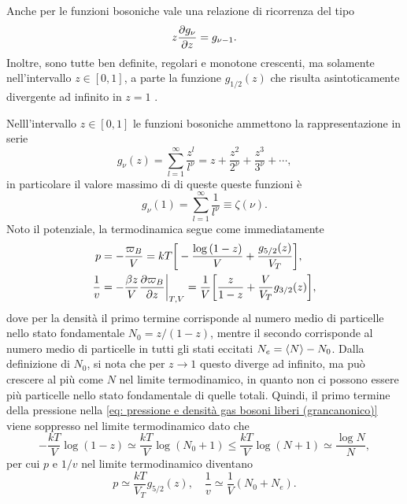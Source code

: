 \begin{obs}
    Anche per le funzioni bosoniche vale una relazione di ricorrenza del tipo
    \begin{equation}
        z\frac{\partial g_\nu}{\partial z} = g_{\nu - 1}.
    \end{equation}
    Inoltre, sono tutte ben definite, regolari e monotone crescenti, ma solamente nell'intervallo $z \in [0,1]$, a parte la funzione $g_{1/2}(z)$ che risulta asintoticamente divergente ad infinito in $z = 1$ .
\end{obs}
Nelll'intervallo $z\in[0,1]$ le funzioni bosoniche ammettono la rappresentazione in serie 
\begin{equation}
\label{eq: funzioni bosonoiche (espansione in serie)}
    g_\nu(z) = \sum_{l=1}^\infty\frac{z^l}{l^\nu} = z + \frac{z^2}{2^\nu} + \frac{z^3}{3^\nu}+ \cdots,
\end{equation}
in particolare il valore massimo di di queste queste funzioni è 
\begin{equation}
    g_\nu(1) = \sum_{l=1}^\infty\frac{1}{l^\nu} \equiv \zeta(\nu).
\end{equation}
Noto il potenziale, la termodinamica segue come immediatamente
\begin{align}
\label{eq: pressione e densità gas bosoni liberi (grancanonico)}
    p &= -\frac{\varpi_B}{V} = kT\bigg[-\frac{\log{(1-z)}}{V} + \frac{g_{5/2}(z)}{V_T}\bigg], \\
    \frac{1}{v} &= -\frac{\beta z}{V}\frac{\partial\varpi_B}{\partial z}\bigg|_{T,V} = \frac{1}{V}\bigg[\frac{z}{1-z} + \frac{V}{V_T}g_{3/2}(z)\bigg], 
\end{align}
dove per la densità il primo termine corrisponde al numero medio di particelle nello stato fondamentale $N_0 = z/(1-z)$, mentre il secondo corrisponde al numero medio di particelle in tutti gli stati eccitati $N_e = \langle N \rangle - N_0$. Dalla definizione di $N_0$, si nota che per $z \to 1$ questo diverge ad infinito, ma può crescere al più come $N$ nel limite termodinamico, in quanto non ci possono essere più particelle nello stato fondamentale di quelle totali. Quindi, il primo termine della pressione nella \eqref{eq: pressione e densità gas bosoni liberi (grancanonico)} viene soppresso nel limite termodinamico dato che
\begin{equation}
    -\frac{kT}{V}\log{(1-z)} \simeq \frac{kT}{V}\log{(N_0 + 1)} \le \frac{kT}{V}\log{(N + 1)} \simeq \frac{\log{N}}{N},
\end{equation}
per cui $p$ e $1/v$ nel limite termodinamico diventano
\begin{equation}
    p \simeq \frac{kT}{V_T}g_{5/2}(z),\quad \frac{1}{v} \simeq \frac{1}{V}(N_0 + N_e).
\end{equation}
